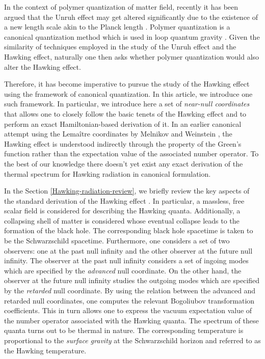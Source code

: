 \documentclass[aps,12pt,showpacs]{revtex4-2}
\begin{document}
In the context of polymer quantization of matter field, recently it has been 
argued that the Unruh effect \cite{Fulling:1972md,Unruh:1976db,Crispino:2007eb} 
may get altered significantly due to the existence of a new length scale akin to 
the Planck length  \cite{Hossain:2014fma,Hossain:2015xqa,Hossain:2016klt}. 
Polymer quantization \cite{Ashtekar:2002sn,Halvorson-2004-35} is a canonical 
quantization method which is used in loop quantum gravity 
\cite{Ashtekar:2004eh,Rovelli2004quantum,Thiemann2007modern}. Given the 
similarity of techniques employed in the study of the Unruh effect and the 
Hawking effect, naturally one then asks whether polymer quantization would also 
alter the Hawking effect.



Therefore, it has become imperative to pursue the study of the Hawking effect 
using the framework of canonical quantization. In this article, we introduce one 
such framework. In particular, we  introduce here a set of \emph{near-null 
coordinates} that allows one to closely follow the basic tenets of the Hawking 
effect and  to perform an exact Hamiltonian-based derivation of it. In an 
earlier canonical attempt using the Lema\^itre coordinates by Melnikov and 
Weinstein \cite{Melnikov:2001ex}, the Hawking effect is understood indirectly 
through the property of the Green's function rather than the expectation value 
of the associated number operator. To the best of our knowledge there doesn't 
yet exist any exact derivation of the thermal spectrum for Hawking radiation in 
canonical formulation. 




In the Section \ref{Hawking-radiation-review}, we briefly review the key aspects 
of the standard derivation of the Hawking effect \cite{hawking1975}. In 
particular, a massless, free scalar field is considered for describing the 
Hawking quanta. Additionally, a collapsing shell of matter is considered whose 
eventual collapse leads to the formation of the black hole. The corresponding 
black hole spacetime is taken to be the Schwarzschild spacetime. Furthermore, 
one considers a set of two observers: one at the past null infinity and the 
other observer at the future null infinity. The observer at the past null 
infinity considers a set of ingoing modes which are specified by the 
\emph{advanced} null coordinate. On the other hand, the observer at the future 
null infinity studies the outgoing modes which are specified by the 
\emph{retarded} null coordinate. By using the relation between the advanced 
and retarded null coordinates, one computes the relevant Bogoliubov 
transformation coefficients. This in turn allows one to express the vacuum 
expectation value of the number operator associated with the Hawking quanta. The 
spectrum of these quanta turns out to be thermal in nature. The corresponding 
temperature is proportional to the \emph{surface gravity} at the Schwarzschild 
horizon and referred to as the Hawking temperature.
\end{document}
